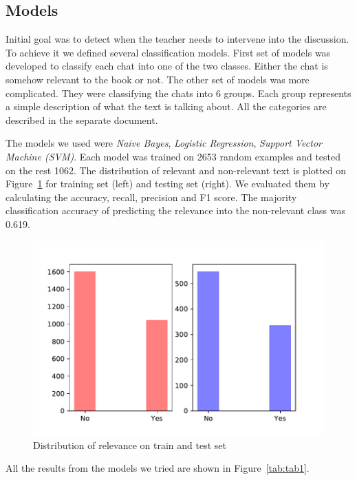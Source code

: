 \documentclass[11pt,a4paper]{article}
\begin{document}
\subsection{Models}
Initial goal was to detect when the teacher needs to intervene into the discussion.
To achieve it we defined several classification models.
First set of models was developed to classify each chat into one of the two classes.
Either the chat is somehow relevant to the book or not.
The other set of models was more complicated.
They were classifying the chats into 6 groups.
Each group represents a simple description of what the text is talking about.
All the categories are described in the separate document. %

The models we used were \textit{Naive Bayes}, \textit{Logistic Regression}, \textit{Support Vector Machine (SVM)}.
Each model was trained on 2653 random examples and tested on the rest 1062.
The distribution of relevant and non-relevant text is plotted on Figure~\ref{fig:fig1} for training set (left) and testing set (right).
We evaluated them by calculating the accuracy, recall, precision and F1 score.
The majority classification accuracy of predicting the relevance into the non-relevant class was 0.619.

\begin{figure}[h]
    \centering
    \includegraphics[width=1.1\columnwidth]{Figures/distribution.pdf}
    \caption{Distribution of relevance on train and test set}
    \label{fig:fig1}
\end{figure}

All the results from the models we tried are shown in Figure~\ref{tab:tab1}.
\end{document}
